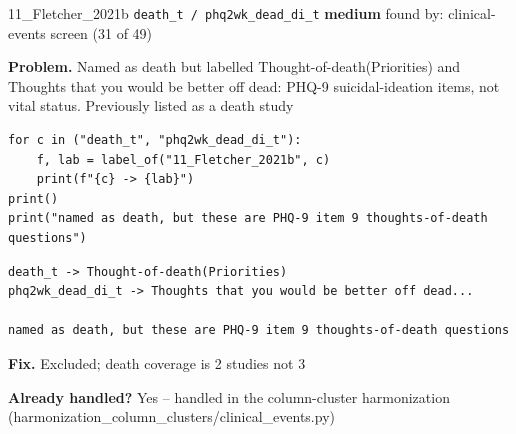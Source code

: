 \documentclass[9pt, t, handout]{beamer}
\newcommand{\ans}[1]{\textcolor{structure.fg}{#1}}
\begin{document}
\begin{frame}[fragile]{11\_Fletcher\_2021b \quad \texttt{death\_t / phq2wk\_dead\_di\_t}}
  {\scriptsize\textcolor{blue!55!black}{\textbf{medium}} \quad
   found by: clinical-events screen \quad (31 of 49)}
  \vspace{3pt}

  {\footnotesize \textbf{Problem.} Named as death but labelled Thought-of-death(Priorities) and Thoughts that you would be better off dead: PHQ-9 suicidal-ideation items, not vital status. Previously listed as a death study}
  \vspace{4pt}

  \begin{Verbatim}[fontsize=\tiny, frame=single, framesep=2pt, label=\tiny reproduce]
for c in ("death_t", "phq2wk_dead_di_t"):
    f, lab = label_of("11_Fletcher_2021b", c)
    print(f"{c} -> {lab}")
print()
print("named as death, but these are PHQ-9 item 9 thoughts-of-death questions")
  \end{Verbatim}
  \begin{Verbatim}[fontsize=\tiny, frame=single, framesep=2pt, label=\tiny output]
death_t -> Thought-of-death(Priorities)
phq2wk_dead_di_t -> Thoughts that you would be better off dead...

named as death, but these are PHQ-9 item 9 thoughts-of-death questions
  \end{Verbatim}
  \vspace{2pt}

  {\footnotesize \textbf{Fix.} Excluded; death coverage is 2 studies not 3}
  \vspace{2pt}

  {\footnotesize \textbf{Already handled?} \ans{Yes} -- handled in the column-cluster harmonization
   (harmonization\_column\_clusters/clinical\_events.py)}
\end{frame}
\end{document}
